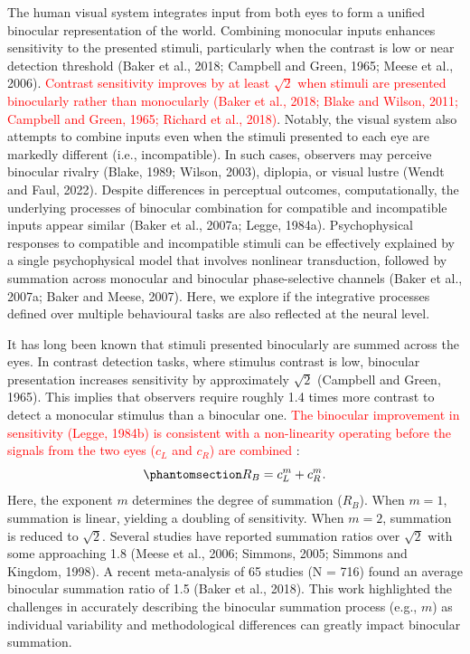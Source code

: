 \documentclass[
  12pt,
]{article}
\begin{document}
The human visual system integrates input from both eyes to form a
unified binocular representation of the world. Combining monocular
inputs enhances sensitivity to the presented stimuli, particularly when
the contrast is low or near detection threshold (Baker et al., 2018;
Campbell and Green, 1965; Meese et al., 2006). \textcolor{red}{Contrast
sensitivity improves by at least \(\sqrt{2}\) when stimuli are presented
binocularly rather than monocularly (Baker et al., 2018; Blake and
Wilson, 2011; Campbell and Green, 1965; Richard et al., 2018)}. Notably,
the visual system also attempts to combine inputs even when the stimuli
presented to each eye are markedly different (i.e., incompatible). In
such cases, observers may perceive binocular rivalry (Blake, 1989;
Wilson, 2003), diplopia, or visual lustre (Wendt and Faul, 2022).
Despite differences in perceptual outcomes, computationally, the
underlying processes of binocular combination for compatible and
incompatible inputs appear similar (Baker et al., 2007a; Legge, 1984a).
Psychophysical responses to compatible and incompatible stimuli can be
effectively explained by a single psychophysical model that involves
nonlinear transduction, followed by summation across monocular and
binocular phase-selective channels (Baker et al., 2007a; Baker and
Meese, 2007). Here, we explore if the integrative processes defined over
multiple behavioural tasks are also reflected at the neural level.

It has long been known that stimuli presented binocularly are summed
across the eyes. In contrast detection tasks, where stimulus contrast is
low, binocular presentation increases sensitivity by approximately
\(\sqrt{2}\) (Campbell and Green, 1965). This implies that observers
require roughly 1.4 times more contrast to detect a monocular stimulus
than a binocular one. \textcolor{red}{The binocular improvement in sensitivity
(Legge, 1984b) is consistent with a non-linearity operating before the
signals from the two eyes (\(c_L\) and \(c_R\)) are combined} :
\begin{equation}\phantomsection\label{eq-IntroMath1}{
R_B = c_L^m + c_R^m.
}\end{equation} Here, the exponent \(m\) determines the degree of
summation (\(R_B\)). When \(m = 1\), summation is linear, yielding a
doubling of sensitivity. When \(m = 2\), summation is reduced to
\(\sqrt{2}\). Several studies have reported summation ratios over
\(\sqrt{2}\) with some approaching 1.8 (Meese et al., 2006; Simmons,
2005; Simmons and Kingdom, 1998). A recent meta-analysis of 65 studies
(N = 716) found an average binocular summation ratio of 1.5 (Baker et
al., 2018). This work highlighted the challenges in accurately
describing the binocular summation process (e.g., \(m\)) as individual
variability and methodological differences can greatly impact binocular
summation.
\end{document}
